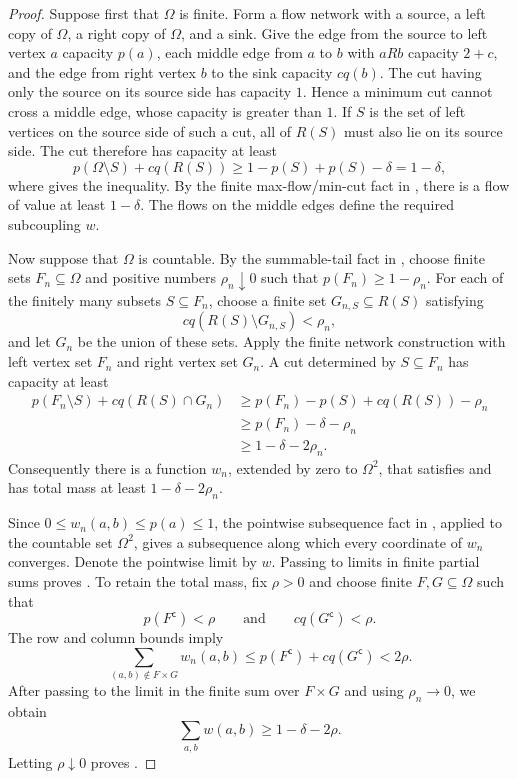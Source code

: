 \documentclass[11pt]{article}
\begin{document}
\begin{proof}
Suppose first that $\Omega$ is finite.  Form a flow network with a source, a
left copy of $\Omega$, a right copy of $\Omega$, and a sink.  Give the edge
from the source to left vertex $a$ capacity $p(a)$, each middle edge from $a$
to $b$ with $aRb$ capacity $2+c$, and the edge from right vertex $b$ to the
sink capacity $cq(b)$.  The cut having only the source on its source side has
capacity $1$.  Hence a minimum cut cannot cross a middle edge, whose capacity
is greater than $1$.  If $S$ is the set of left vertices on the source side of
such a cut, all of $R(S)$ must also lie on its source side.  The cut therefore
has capacity at least
\[
 p(\Omega\setminus S)+cq(R(S))
 \geq 1-p(S)+p(S)-\delta
 =1-\delta,
\]
where  gives the inequality.
By the finite max-flow/min-cut fact in , there is a flow
of value at least $1-\delta$.  The flows on the middle edges define the
required subcoupling $w$.

Now suppose that $\Omega$ is countable.  By the summable-tail fact in
, choose finite sets
$F_n\subseteq\Omega$ and positive numbers $\rho_n\downarrow0$ such that
$p(F_n)\geq1-\rho_n$.  For each of the finitely many subsets
$S\subseteq F_n$, choose a finite set $G_{n,S}\subseteq R(S)$ satisfying
\[
 cq(R(S)\setminus G_{n,S})<\rho_n,
\]
and let $G_n$ be the union of these sets.  Apply the finite network construction
with left vertex set $F_n$ and right vertex set $G_n$.  A cut determined by
$S\subseteq F_n$ has capacity at least
\begin{align*}
 p(F_n\setminus S)+cq(R(S)\cap G_n)
 &\geq p(F_n)-p(S)+cq(R(S))-\rho_n\\
 &\geq p(F_n)-\delta-\rho_n\\
 &\geq1-\delta-2\rho_n.
\end{align*}
Consequently there is a function $w_n$, extended by zero to $\Omega^2$, that
satisfies  and has total mass at least
$1-\delta-2\rho_n$.

Since $0\leq w_n(a,b)\leq p(a)\leq1$, the pointwise subsequence fact in
, applied to the countable set $\Omega^2$, gives a
subsequence along which every coordinate of $w_n$ converges.  Denote the
pointwise limit by $w$.  Passing to limits in finite partial sums proves
.
To retain the total mass, fix $\rho>0$ and choose finite
$F,G\subseteq\Omega$ such that
\[
 p(F^{\mathsf c})<\rho
 \qquad\text{and}\qquad
 cq(G^{\mathsf c})<\rho.
\]
The row and column bounds imply
\[
 \sum_{(a,b)\notin F\times G}w_n(a,b)
 \leq p(F^{\mathsf c})+cq(G^{\mathsf c})<2\rho.
\]
After passing to the limit in the finite sum over $F\times G$ and using
$\rho_n\to0$, we obtain
\[
 \sum_{a,b}w(a,b)\geq1-\delta-2\rho.
\]
Letting $\rho\downarrow0$ proves .
\end{proof}
\end{document}
